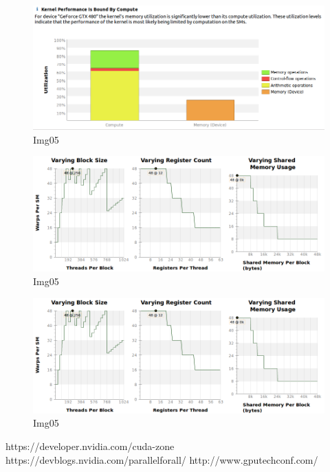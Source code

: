 \documentclass[a4paper]{article}
\begin{document}
\begin{figure}[!ht]
    \centering
    \includegraphics[width=0.7\linewidth]{profiling/darker/darker_utilization_00}
    \caption{Img05}
    \label{fig:du}
\end{figure}
\FloatBarrier

\begin{figure}[!ht]
    \centering
    \includegraphics[width=0.7\linewidth]{profiling/darker/darker_varying}
    \caption{Img05}
    \label{fig:dv}
\end{figure}
\FloatBarrier



\begin{figure}[!ht]
    \centering
    \includegraphics[width=0.7\linewidth]{profiling/darker/darker_varying}
    \caption{Img05}
    \label{fig:img05Prof}
\end{figure}
\FloatBarrier

\printbibliography 

https://developer.nvidia.com/cuda-zone
https://devblogs.nvidia.com/parallelforall/
http://www.gputechconf.com/
\end{document}
